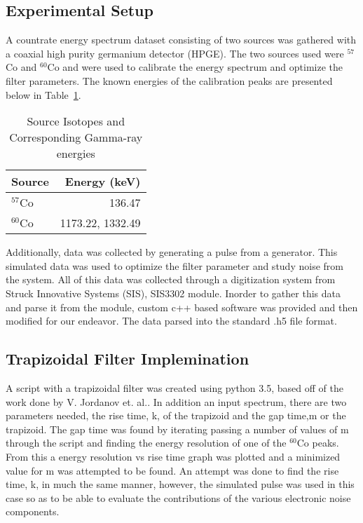 \subsection{Experimental Setup}
A countrate energy spectrum dataset consisting of two sources was gathered with a coaxial high purity germanium detector (HPGE). 
The two sources used were  $^{57}$Co and $^{60}$Co and were used to calibrate the energy spectrum and optimize the filter parameters. The known energies of the calibration peaks are presented below in Table~\ref{tab:CalSrc}.

\begin{table}[H]
        \begin{center}
                \begin{tabular}{l|r}
                        \textbf{Source} & \textbf{Energy (keV)}\\
                        \hline
                        $^{57}$Co      &       136.47    \\
                        $^{60}$Co      &       1173.22, 1332.49   \\
                \end{tabular}
                \caption{Source Isotopes and Corresponding Gamma-ray energies}
                \label{tab:CalSrc}
        \end{center}
\end{table}

Additionally, data was collected by generating a pulse from a generator. This simulated data was used to optimize the filter parameter and study noise from the system. 
All of this data was collected through a digitization system from Struck Innovative Systems (SIS), SIS3302 module. Inorder to gather this data and parse it from the module,
custom c++ based software was provided and then modified for our endeavor. The data parsed into the standard .h5 file format. 

\subsection{Trapizoidal Filter Implemination}
	
	A script with a trapizoidal filter  was created using python 3.5, based off of the work done by V. Jordanov et. al.\cite{jordanov1994digital}. In addition an input spectrum, there are two parameters needed,
	the rise time, k, of the trapizoid and the gap time,m or the trapizoid. The gap time was found by iterating passing a number of values of m through the script and finding the energy resolution of one of the  $^{60}$Co peaks. From this a energy resolution vs rise time graph was plotted and a minimized value for m was attempted to be found. An attempt was done to find the rise time, k, in much the same manner, however, the simulated pulse was used in this case so as to be able to evaluate the contributions of the various electronic noise components. 

